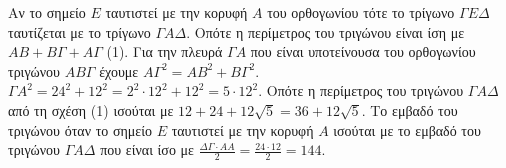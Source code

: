 \begin{alist}
\begin{rlist}
\begin{figure}
\end{figure}
Αν το σημείο $E$ ταυτιστεί με την κορυφή $A$ του ορθογωνίου τότε το τρίγωνο $\Gamma E\Delta$ ταυτίζεται με το τρίγωνο $\Gamma A\Delta$. Οπότε η περίμετρος του τριγώνου είναι ίση με $AB + B\Gamma + A\Gamma$ (1). Για την πλευρά $\Gamma A$ που είναι υποτείνουσα του ορθογωνίου τριγώνου $AB\Gamma$ έχουμε $A\Gamma^2 = AB^2 + B\Gamma^2$.
$\Gamma A^2 = 24^2 + 12^2 = 2^2 \cdot 12^2 + 12^2 = 5 \cdot 12^2$. Οπότε η περίμετρος του τριγώνου $\Gamma A\Delta$ από τη σχέση (1) ισούται με $12 + 24 + 12\sqrt{5} = 36 + 12\sqrt{5}$.
Το εμβαδό του τριγώνου όταν το σημείο $E$ ταυτιστεί με την κορυφή $A$ ισούται με το εμβαδό του τριγώνου $\Gamma A\Delta$ που είναι ίσο με $\frac{\Delta\Gamma \cdot AA}{2} = \frac{24 \cdot 12}{2} = 144$.

\item \begin{figure}
    \centering
\end{figure}
\end{rlist}
\end{alist}
